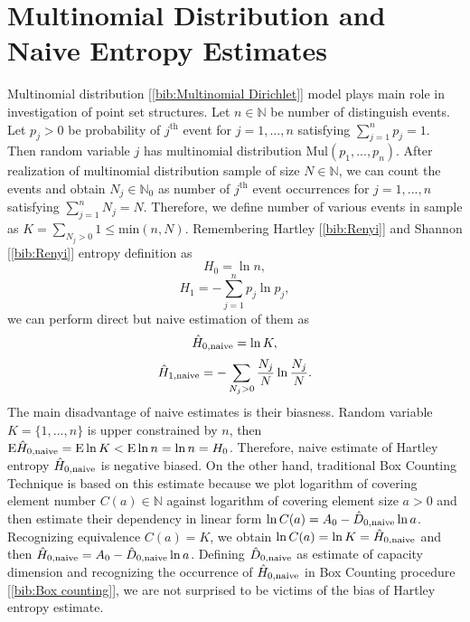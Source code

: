 \section {Multinomial Distribution and Naive Entropy Estimates}

Multinomial distribution [\ref{bib:Multinomial Dirichlet}] model plays main role in investigation of point set structures. Let $n \in \mathbb{N}$ be number of distinguish events. Let $p_{j} > 0$ be probability of $j^{\text{th}}$ event for $j = 1,...,n$ satisfying $ \sum_{j=1}^{n} p_{j} =1$. Then random variable $j$ has multinomial distribution $\text{Mul}(p_{1},...,p_{n})$. After realization of multinomial distribution sample of size $N \in \mathbb{N}$, we can count the events and obtain $N_{j} \in \mathbb{N}_{0}$ as number of $j^{\text{th}}$ event occurrences for $j=1,...,n$ satisfying $\sum_{j=1}^{n} N_{j} = N$. Therefore, we define number of various events in sample as $K = \sum_{N_{j}>0} 1 \le \text{min}(n,N)$. Remembering Hartley [\ref{bib:Renyi}] and Shannon [\ref{bib:Renyi}] entropy definition as
\begin{equation} 
\label{eq:hnula}
H_{0}=\ln{n},
\end{equation} 
\begin{equation} 
\label{eq:hjedna}
H_{1}=-\sum_{j=1}^{n} p_{j}\ln{p_{j}},
\end{equation}   
we can perform direct but naive estimation of them as
\begin{equation} 
\label{eq:hnulaap}
\hat{H}_{0,\mbox{\scriptsize{naive}}}=\ln{K},
\end{equation} 
\begin{equation} 
\label{eq:hjednaap}
\hat{H}_{1,\mbox{\scriptsize{naive}}}=-\sum_{N_{j}>0} \frac{N_{j}}{N}\ln{\frac{N_{j}}{N}}.
\end{equation}   
The main disadvantage of naive estimates is their biasness. Random variable $K= \{ 1,...,n \} $ is upper constrained by $n$, then $\text{E}\hat{H}_{0,\mbox{\scriptsize{naive}}} = \text{E}\ln{K} < \text{E}\ln{n} = \ln{n} = H_{0}$. Therefore, naive estimate of Hartley entropy $\hat{H}_{0,\mbox{\scriptsize{naive}}}$ is negative biased. On the other hand, traditional Box Counting Technique is based on this estimate because we plot logarithm of covering element number $C(a) \in \mathbb{N}$ against logarithm of covering element size $a > 0$ and then estimate their dependency in linear form $\ln{C(a)} = A_{0} - \hat{D}_{0,\mbox{\scriptsize{naive}}}\ln{a}$. Recognizing equivalence $C(a) = K$, we obtain $\ln{C(a)} = \ln{K} = \hat{H}_{0,\mbox{\scriptsize{naive}}}$ and then $\hat{H}_{0,\mbox{\scriptsize{naive}}} = A_{0} - \hat{D}_{0,\mbox{\scriptsize{naive}}}\ln{a}$. Defining $\hat{D}_{0,\mbox{\scriptsize{naive}}}$ as estimate of capacity dimension and recognizing the occurrence of $\hat{H}_{0,\mbox{\scriptsize{naive}}}$ in Box Counting procedure [\ref{bib:Box counting}], we are not surprised to be victims of the bias of Hartley entropy estimate.\\ 
